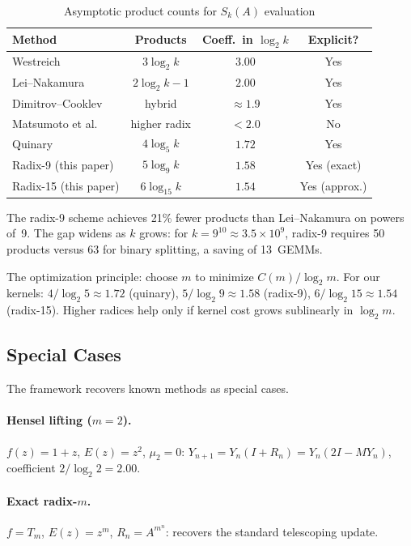 \documentclass[
  journal=largetwo,
  manuscript=article,
  manuscriptlabel={Research Preprint},
  logo=false,
  simfonts=false,
  year=2026,
  volume=1,
]{cup-journal}
\theoremstyle{definition}
\theoremstyle{remark}
\begin{document}
\begin{table}[t]
  \centering
  \caption{Asymptotic product counts for $S_k(A)$ evaluation}
  \label{tab:compare}
  \begin{tabular}{@{}lccc@{}}
    \toprule
    Method & Products & Coeff.\ in $\log_2 k$ & Explicit? \\
    \midrule
    Westreich~\cite{westreich1989} & $3\log_2 k$ & $3.00$ & Yes \\
    Lei--Nakamura~\cite{lei1992} & $2\log_2 k - 1$ & $2.00$ & Yes \\
    Dimitrov--Cooklev~\cite{dimitrov1995} & hybrid & $\approx 1.9$ & Yes \\
    Matsumoto et al.~\cite{matsumoto2018} & higher radix & $< 2.0$ & No \\
    \midrule
    Quinary~\cite{gustafsson2017} & $4\log_5 k$ & $1.72$ & Yes \\
    Radix-9 (this paper) & $5\log_9 k$ & $1.58$ & Yes (exact) \\
    Radix-15 (this paper) & $6\log_{15} k$ & $1.54$ & Yes (approx.) \\
    \bottomrule
  \end{tabular}
\end{table}

The radix-9 scheme achieves 21\% fewer products than
Lei--Nakamura on powers of~9.
The gap widens as $k$ grows: for $k = 9^{10} \approx 3.5 \times 10^9$,
radix-9 requires 50 products versus 63 for binary splitting,
a saving of 13~GEMMs.

The optimization principle: choose $m$ to minimize $C(m)/\log_2 m$.
For our kernels: $4/\log_2 5 \approx 1.72$ (quinary),
$5/\log_2 9 \approx 1.58$ (radix-9),
$6/\log_2 15 \approx 1.54$ (radix-15).
Higher radices help only if kernel cost grows sublinearly in $\log_2 m$.

\subsection{Special Cases}

The framework recovers known methods as special cases.

\paragraph{Hensel lifting ($m = 2$).}
$f(z) = 1 + z$, $E(z) = z^2$, $\mu_2 = 0$:
$Y_{n+1} = Y_n(I + R_n) = Y_n(2I - MY_n)$,
coefficient $2/\log_2 2 = 2.00$.

\paragraph{Exact radix-$m$.}
$f = T_m$, $E(z) = z^m$, $R_n = A^{m^n}$: recovers the standard
telescoping update.
\end{document}
